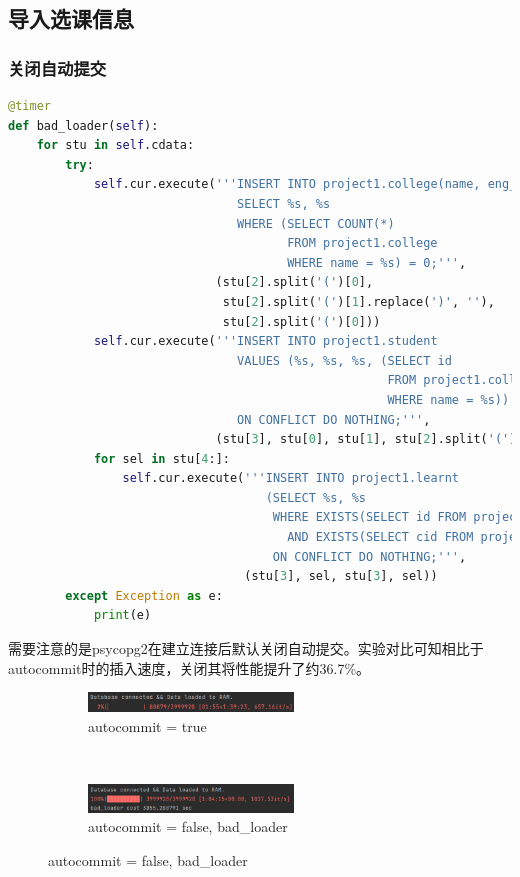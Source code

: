 \subsection{导入选课信息}
\subsubsection{关闭自动提交}
\begin{lstlisting}[language=python]
@timer
def bad_loader(self):
    for stu in self.cdata:
        try:
            self.cur.execute('''INSERT INTO project1.college(name, eng_name)
                                SELECT %s, %s
                                WHERE (SELECT COUNT(*)
                                       FROM project1.college
                                       WHERE name = %s) = 0;''',
                             (stu[2].split('(')[0],
                              stu[2].split('(')[1].replace(')', ''),
                              stu[2].split('(')[0]))
            self.cur.execute('''INSERT INTO project1.student
                                VALUES (%s, %s, %s, (SELECT id
                                                     FROM project1.college
                                                     WHERE name = %s))
                                ON CONFLICT DO NOTHING;''',
                             (stu[3], stu[0], stu[1], stu[2].split('(')[0]))
            for sel in stu[4:]:
                self.cur.execute('''INSERT INTO project1.learnt
                                    (SELECT %s, %s
                                     WHERE EXISTS(SELECT id FROM project1.student WHERE id = %s)
                                       AND EXISTS(SELECT cid FROM project1.course WHERE cid = %s))
                                     ON CONFLICT DO NOTHING;''',
                                 (stu[3], sel, stu[3], sel))
        except Exception as e:
            print(e)
\end{lstlisting}
\vspace{-3em}\par
需要注意的是psycopg2在建立连接后默认关闭自动提交。实验对比可知相比于autocommit时的插入速度，关闭其将性能提升了约36.7\%。
~\\
\begin{figure}[!h]
	\centering
	\begin{subfigure}[b]{0.8\textwidth}
		\centerline{\includegraphics[width=0.6\textwidth]{./sp/autocommit.png}}
		\caption{autocommit = true}
	\end{subfigure}\\
	\begin{subfigure}[b]{0.8\textwidth}
		\centerline{\includegraphics[width=0.6\textwidth]{./sp/bl.png}}
		\caption{autocommit = false, bad\_loader}
	\end{subfigure}	
	\label{fig:visual_smap}
\end{figure}
